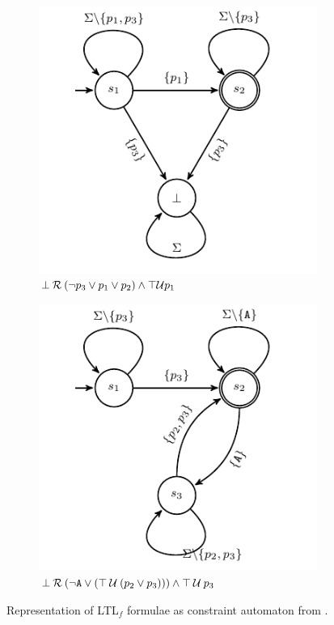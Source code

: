 \begin{figure}[!t]
	\centering
	\begin{subfigure}[b]{0.45\textwidth}
		\centering
		\includegraphics[width=\textwidth]{images/example_1_graph}
		\caption{$\bot\mathbin{\mathcal{R}}(\neg p_3\vee p_1\vee p_2) \wedge \top\mathcal{U}p_1$}
		\label{fig:g1}
	\end{subfigure}
	\hfill
	\begin{subfigure}[b]{0.45\textwidth}
		\centering
		\includegraphics[width=\textwidth]{images/example_2_graph}
		\caption{$\bot\mathbin{\mathcal{R}}(\neg\texttt{A}\vee(\top\mathbin{\mathcal{U}}(p_2\vee p_3)))\wedge\top\mathbin{\mathcal{U}} p_3$}
		\label{fig:g2}
	\end{subfigure}
	\caption{Representation of LTL$_f$ formulae as constraint automaton from \cite{LeoniMA12,Westergaard11}.}
	\label{fig:g1g2}
\end{figure}

